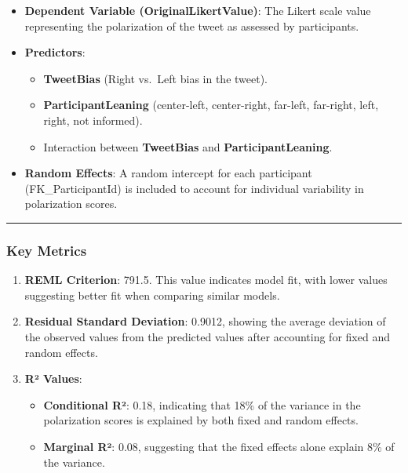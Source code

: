 \documentclass[
]{article}
\providecommand{\tightlist}{%
  \setlength{\itemsep}{0pt}\setlength{\parskip}{0pt}}
\begin{document}
\begin{itemize}
\tightlist
\item
  \textbf{Dependent Variable (OriginalLikertValue)}: The Likert scale
  value representing the polarization of the tweet as assessed by
  participants.
\item
  \textbf{Predictors}:

  \begin{itemize}
  \tightlist
  \item
    \textbf{TweetBias} (Right vs.~Left bias in the tweet).
  \item
    \textbf{ParticipantLeaning} (center-left, center-right, far-left,
    far-right, left, right, not informed).
  \item
    Interaction between \textbf{TweetBias} and
    \textbf{ParticipantLeaning}.
  \end{itemize}
\item
  \textbf{Random Effects}: A random intercept for each participant
  (FK\_ParticipantId) is included to account for individual variability
  in polarization scores.
\end{itemize}

\begin{center}\rule{0.5\linewidth}{0.5pt}\end{center}

\subsubsection{\texorpdfstring{\textbf{Key
Metrics}}{Key Metrics}}\label{key-metrics-4}

\begin{enumerate}
\def\labelenumi{\arabic{enumi}.}
\tightlist
\item
  \textbf{REML Criterion}: 791.5. This value indicates model fit, with
  lower values suggesting better fit when comparing similar models.
\item
  \textbf{Residual Standard Deviation}: 0.9012, showing the average
  deviation of the observed values from the predicted values after
  accounting for fixed and random effects.
\item
  \textbf{R² Values}:

  \begin{itemize}
  \tightlist
  \item
    \textbf{Conditional R²}: 0.18, indicating that 18\% of the variance
    in the polarization scores is explained by both fixed and random
    effects.
  \item
    \textbf{Marginal R²}: 0.08, suggesting that the fixed effects alone
    explain 8\% of the variance.
  \end{itemize}
\end{enumerate}
\end{document}
